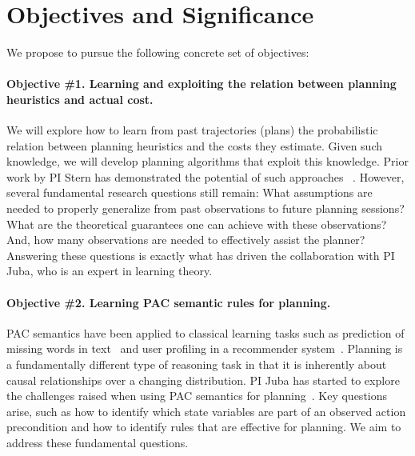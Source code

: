 \documentclass[12pt]{article}
\begin{document}
 

\section{Objectives and Significance}

We propose to pursue the following concrete set of objectives:

\vspace{-0.35cm}
\paragraph{Objective \#1. Learning and exploiting the relation between planning heuristics and actual cost.} We will explore how to learn from past trajectories (plans) the probabilistic relation between planning heuristics and the costs they estimate. Given such knowledge, we will develop planning algorithms that exploit this knowledge. Prior work by PI Stern has demonstrated the potential of such approaches~
\cite{stern2011probably,stern2012exploring,stern2014potential}. %
However, several fundamental research questions still remain: What assumptions are needed to properly generalize from past observations to future planning sessions? What are the theoretical guarantees one can achieve with these observations? And, how many observations are needed to effectively assist the planner? Answering these questions is exactly what has driven the collaboration with PI Juba, who is an expert in learning theory. 


\vspace{-0.35cm}
\paragraph{Objective \#2. Learning PAC semantic rules for planning.}
PAC semantics have been applied to classical learning tasks such as prediction of missing words in text~\cite{michael2008first} and user profiling in a recommender system~\cite{semeraro2009knowledge}. Planning is a fundamentally different type of reasoning task in that it is inherently about causal relationships over a changing distribution. PI Juba has started to explore the challenges raised when using PAC semantics for planning~\cite{juba2016jmlr}. Key questions arise, such as how to identify which state variables are part of an observed action precondition and how to identify rules that are effective for planning. We aim to address these fundamental questions.
\end{document}
